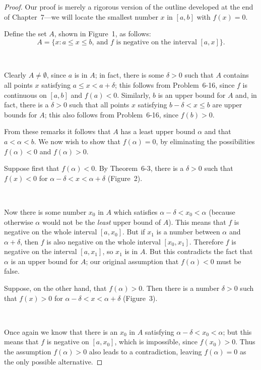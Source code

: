 \begin{proof}
Our proof is merely a rigorous version of the outline developed at the end of
Chapter~7---we will locate the smallest number $x$ in $[a,b]$ with $f(x) = 0$.

Define the set $A$, shown in Figure~1, as follows:
\[
A = \{x : a \leq x \leq b,\ \text{and $f$ is negative on the interval $[a,x]$}\}.
\]
\begin{center}
\\[0.6em]
\end{center}
Clearly $A \neq \emptyset$, since $a$ is in $A$; in fact, there is some
$\delta > 0$ such that $A$ contains all points $x$ satisfying
$a \leq x < a + \delta$; this follows from Problem~6-16, since $f$ is
continuous on $[a,b]$ and $f(a) < 0$. Similarly, $b$ is an upper bound for
$A$ and, in fact, there is a $\delta > 0$ such that all points $x$ satisfying
$b - \delta < x \leq b$ are upper bounds for $A$; this also follows from
Problem~6-16, since $f(b) > 0$.

From these remarks it follows that $A$ has a least upper bound $\alpha$ and
that $a < \alpha < b$. We now wish to show that $f(\alpha) = 0$, by
eliminating the possibilities $f(\alpha) < 0$ and $f(\alpha) > 0$.

Suppose first that $f(\alpha) < 0$. By Theorem~6-3, there is a $\delta > 0$
such that $f(x) < 0$ for $\alpha - \delta < x < \alpha + \delta$ (Figure~2).
\begin{center}
\\[0.6em]
\end{center}
Now there is some number $x_0$ in $A$ which satisfies
$\alpha - \delta < x_0 < \alpha$ (because otherwise $\alpha$ would not be the
\emph{least} upper bound of $A$). This means that $f$ is negative on the
whole interval $[a,x_0]$. But if $x_1$ is a number between $\alpha$ and
$\alpha + \delta$, then $f$ is also negative on the whole interval
$[x_0,x_1]$. Therefore $f$ is negative on the interval $[a,x_1]$, so $x_1$
is in $A$. But this contradicts the fact that $\alpha$ is an upper bound for
$A$; our original assumption that $f(\alpha) < 0$ must be false.

Suppose, on the other hand, that $f(\alpha) > 0$. Then there is a number
$\delta > 0$ such that $f(x) > 0$ for $\alpha - \delta < x < \alpha + \delta$
(Figure~3).
\begin{center}
\\[0.6em]
\end{center}
Once again we know that there is an $x_0$ in $A$ satisfying
$\alpha - \delta < x_0 < \alpha$; but this means that $f$ is negative on
$[a,x_0]$, which is impossible, since $f(x_0) > 0$. Thus the assumption
$f(\alpha) > 0$ also leads to a contradiction, leaving $f(\alpha) = 0$ as the
only possible alternative.
\end{proof}

